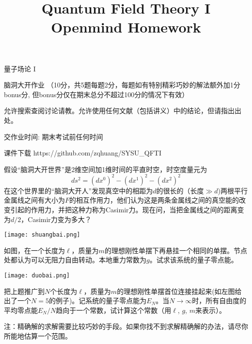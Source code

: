 \documentclass[CJK]{beamer}
\title{Quantum Field Theory I \\ Openmind Homework}
\author{}
\date{}
\begin{document}
\begin{frame}
 
\begin{center}
\begin{Large}
\bch
量子场论 I 

{\vskip 0.3in}

脑洞大开作业 （10分，共5题每题2分，每题如有特别精彩巧妙的解法额外加1分bonus分, 但bonus分仅在期末总分不超过100分的情况下有效）

\skipline
允许搜索查阅讨论请教。允许使用任何文献（包括讲义）中的结论，但请指出出处。

\skipline
交作业时间: 期末考试前任何时间

\ech
\end{Large}
\end{center}

\vskip 0.2in

\bch
课件下载
\ech
https://github.com/zqhuang/SYSU\_QFTI

\end{frame}


\begin{frame}
\bch
假设“脑洞大开世界”是2维空间加1维时间的平直时空，时空度量元为
$$ds^2 = (dx^0)^2 - (dx^1)^2-(dx^2)^2$$
在这个世界里的“脑洞大开人”发现真空中的相距为$d$的很长的（长度$\gg d$)两根平行金属线之间有大小为$F$的相互作用力，他们认为这是两条金属线之间的真空能的改变引起的作用力，并把这种力称为Casimir力。现在问，当把金属线之间的距离变为$d/2$，Casimir力变为多大？

\ech
\end{frame}

\begin{frame}
\bch
\begin{minipage}{0.3\textwidth}
\texttt{[image: shuangbai.png]}
\end{minipage}
\begin{minipage}{0.5\textwidth}
如图，在一个长度为$\ell$，质量为$m$的理想刚性单摆下再悬挂一个相同的单摆。节点处都认为可以无阻力自由转动。本地重力常数为$g$。试求该系统的量子零点能。

\end{minipage}
\ech
\end{frame}

\begin{frame}
\bch
\begin{minipage}{0.3\textwidth}
\texttt{[image: duobai.png]}
\end{minipage}
\begin{minipage}{0.5\textwidth}
把上题推广到$N$个长度为$\ell$，质量为$m$的理想刚性单摆首位连接挂起来(如左图给出了一个$N=5$的例子)。记系统的量子零点能为$E_N$。当$N\rightarrow \infty$时，所有自由度的平均零点能$E_N/N$趋向于一个常数，试计算这个常数（用$\ell$, $g$, $m$来表示）。

\skipline
{\scriptsize 
注：精确解的求解需要比较巧妙的手段。如果你找不到求解精确解的办法，请尽你所能地估算一个范围。
}
\end{minipage}

\ech
\end{frame}
\end{document}
